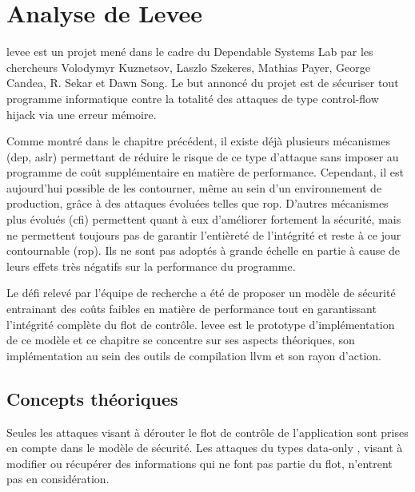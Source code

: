 \chapter{Analyse de Levee}
\label{chap:levee}


\gls{levee} est un projet mené dans le cadre du Dependable Systems Lab \cite{dslab} par les chercheurs Volodymyr Kuznetsov, Laszlo Szekeres, Mathias Payer, George Candea, R. Sekar et Dawn Song. Le but annoncé du projet est de sécuriser tout programme informatique contre la totalité des attaques de type \og control-flow hijack \fg via une erreur mémoire.

Comme montré dans le chapitre précédent, il existe déjà plusieurs mécanismes (\gls{dep}, \gls{aslr}) permettant de réduire le risque de ce type d'attaque sans imposer au programme de coût supplémentaire en matière de performance. Cependant, il est aujourd'hui possible de les contourner, même au sein d'un environnement de production, grâce à des attaques évoluées telles que \gls{rop}. D'autres mécanismes plus évolués (\gls{cfi}) permettent quant à eux d'améliorer fortement la sécurité, mais ne permettent toujours pas de garantir l'entièreté de l'intégrité et reste à ce jour contournable (\gls{rop}). Ils ne sont pas adoptés à grande échelle en partie à cause de leurs effets très négatifs sur la performance du programme.

Le défi relevé par l'équipe de recherche a été de proposer un modèle de sécurité entrainant des coûts faibles en matière de performance tout en garantissant l'intégrité complète du flot de contrôle. \gls{levee} est le prototype d'implémentation de ce modèle et ce chapitre se concentre sur ses aspects théoriques, son implémentation au sein des outils de compilation \gls{llvm} et son rayon d'action.

\minitoc

\newpage

\section{Concepts théoriques}

Seules les attaques visant à dérouter le flot de contrôle de l'application sont prises en compte dans le modèle de sécurité. Les attaques du types \og data-only \fg, visant à modifier ou récupérer des informations qui ne font pas partie du flot, n'entrent pas en considération.

